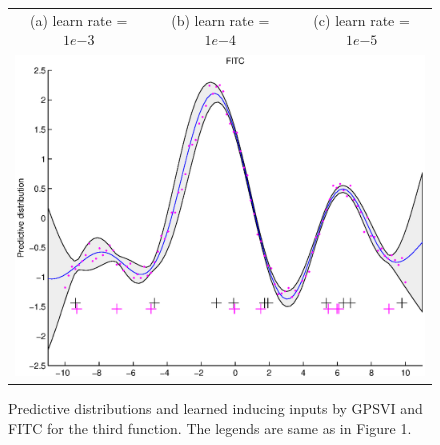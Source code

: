 \documentclass{article} %
\begin{document}
\begin{figure}
\begin{tabular}{ccc}
(a) learn rate = $1e{-3}$ & (b) learn rate = $1e{-4}$ & (c) learn rate = $1e{-5}$ \\
\multicolumn{3}{c}{\includegraphics[scale=0.4]{figures/func3-fitc.eps}}
\end{tabular}
\caption{Predictive distributions and learned inducing inputs by GPSVI and FITC for the third function. The legends are same as in Figure 1.}
\label{fig3}
\end{figure}



\end{document}
